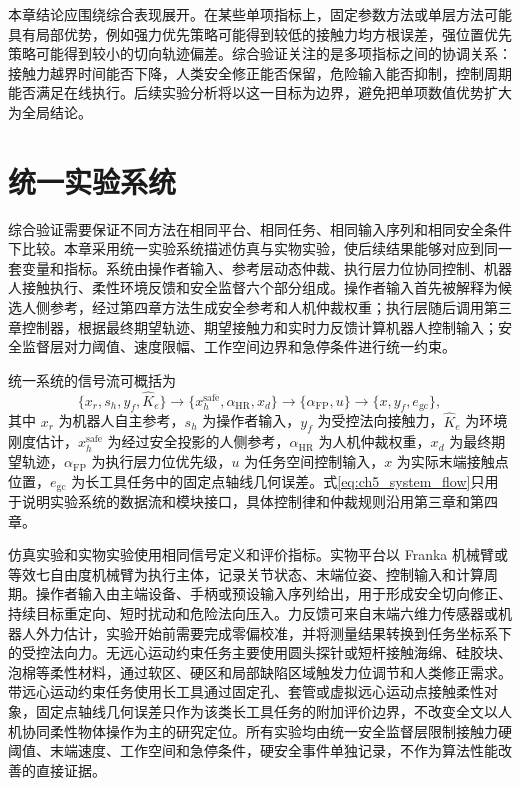 本章结论应围绕综合表现展开。在某些单项指标上，固定参数方法或单层方法可能具有局部优势，例如强力优先策略可能得到较低的接触力均方根误差，强位置优先策略可能得到较小的切向轨迹偏差。综合验证关注的是多项指标之间的协调关系：接触力越界时间能否下降，人类安全修正能否保留，危险输入能否抑制，控制周期能否满足在线执行。后续实验分析将以这一目标为边界，避免把单项数值优势扩大为全局结论。

\section{统一实验系统}
\label{sec:ch5_system}

综合验证需要保证不同方法在相同平台、相同任务、相同输入序列和相同安全条件下比较。本章采用统一实验系统描述仿真与实物实验，使后续结果能够对应到同一套变量和指标。系统由操作者输入、参考层动态仲裁、执行层力位协同控制、机器人接触执行、柔性环境反馈和安全监督六个部分组成。操作者输入首先被解释为候选人侧参考，经过第四章方法生成安全参考和人机仲裁权重；执行层随后调用第三章控制器，根据最终期望轨迹、期望接触力和实时力反馈计算机器人控制输入；安全监督层对力阈值、速度限幅、工作空间边界和急停条件进行统一约束。

统一系统的信号流可概括为
\begin{equation}
  \{x_r,s_h,y_f,\hat K_e\}
  \longrightarrow
  \{x_h^{\mathrm{safe}},\alpha_{\mathrm{HR}},x_d\}
  \longrightarrow
  \{\alpha_{\mathrm{FP}},u\}
  \longrightarrow
  \{x,y_f,e_{\mathrm{gc}}\},
  \label{eq:ch5_system_flow}
\end{equation}
其中 $x_r$ 为机器人自主参考，$s_h$ 为操作者输入，$y_f$ 为受控法向接触力，$\hat K_e$ 为环境刚度估计，$x_h^{\mathrm{safe}}$ 为经过安全投影的人侧参考，$\alpha_{\mathrm{HR}}$ 为人机仲裁权重，$x_d$ 为最终期望轨迹，$\alpha_{\mathrm{FP}}$ 为执行层力位优先级，$u$ 为任务空间控制输入，$x$ 为实际末端接触点位置，$e_{\mathrm{gc}}$ 为长工具任务中的固定点轴线几何误差。式\eqref{eq:ch5_system_flow}只用于说明实验系统的数据流和模块接口，具体控制律和仲裁规则沿用第三章和第四章。

仿真实验和实物实验使用相同信号定义和评价指标。实物平台以 Franka 机械臂或等效七自由度机械臂为执行主体，记录关节状态、末端位姿、控制输入和计算周期。操作者输入由主端设备、手柄或预设输入序列给出，用于形成安全切向修正、持续目标重定向、短时扰动和危险法向压入。力反馈可来自末端六维力传感器或机器人外力估计，实验开始前需要完成零偏校准，并将测量结果转换到任务坐标系下的受控法向力。无远心运动约束任务主要使用圆头探针或短杆接触海绵、硅胶块、泡棉等柔性材料，通过软区、硬区和局部缺陷区域触发力位调节和人类修正需求。带远心运动约束任务使用长工具通过固定孔、套管或虚拟远心运动点接触柔性对象，固定点轴线几何误差只作为该类长工具任务的附加评价边界，不改变全文以人机协同柔性物体操作为主的研究定位。所有实验均由统一安全监督层限制接触力硬阈值、末端速度、工作空间和急停条件，硬安全事件单独记录，不作为算法性能改善的直接证据。

